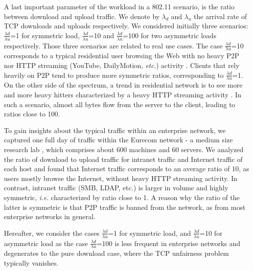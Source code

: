 \documentclass[preprint,12pt]{elsarticle}
\begin{document}
A last important parameter of the workload in a 802.11 scenario, is the ratio between download and upload traffic. We denote by $\lambda_{d}$ and $\lambda_{u}$ the arrival rate of TCP downloads and uploads respectively. We considered initially  three scenarios: $\frac{\lambda{d}}{\lambda{u}}$=1 for symmetric load, $\frac{\lambda{d}}{\lambda{u}}$=10 and $\frac{\lambda{d}}{\lambda{u}}$=100 for two asymmetric loads respectively. Those three scenarios are related to real use cases. The case $\frac{\lambda{d}}{\lambda{u}}$=10  corresponds to a typical residential user browsing the Web with no  heavy P2P nor HTTP streaming (YouTube, DailyMotion, \textit{etc.}) activity \cite{Pietrzyk2011}. Clients that rely heavily on P2P tend to produce more symmetric ratios, corresponding to $\frac{\lambda{d}}{\lambda{u}}$=1. On the other side of the spectrum, a trend in residential network is to see more and more heavy hitters characterized by a heavy HTTP streaming activity \cite{Pietrzyk2011}. In such a scenario, almost all bytes flow from the server to the client, leading to ratios close to 100.


To gain insights about the typical traffic within an enterprise network, we captured one full day of traffic within the Eurecom network - a medium size research lab%
, which comprises about 600 machines and 60 servers. We analyzed the ratio of download to upload traffic for intranet traffic and Internet traffic of each host and found that Internet traffic corresponds to an average ratio of 10, as users mostly browse the Internet, without heavy HTTP streaming activity. In contrast, intranet traffic (SMB, LDAP, etc.) is  larger in volume and highly symmetric, \textit{i.e.} characterized by ratio close to 1. A reason why the ratio of the latter is symmetric is that P2P traffic is banned from the network, as from most enterprise networks in general. 


Hereafter, we consider the cases  $\frac{\lambda{d}}{\lambda{u}}$=1 for symmetric load, and $\frac{\lambda{d}}{\lambda{u}}$=10 for asymmetric load as the case $\frac{\lambda{d}}{\lambda{u}}$=100 is less frequent in enterprise networks and degenerates to the pure download case, where the TCP unfairness problem typically vanishes. %
\end{document}
